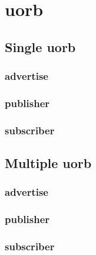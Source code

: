 \chapter{uorb}

\section{Single uorb}

    \subsection{advertise}
    \clearpage

    \subsection{publisher}
    \clearpage

    \subsection{subscriber}
    \clearpage

\section{Multiple uorb}

    \subsection{advertise}
    \clearpage

    \subsection{publisher}
    \clearpage

    \subsection{subscriber}
    \clearpage



